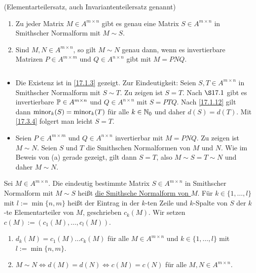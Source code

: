 \documentclass[../../main.tex]{subfiles}
\begin{document}
\begin{sat}\label{17.3.5}
    (Elementarteilersatz, auch Invariantenteilersatz genannt)
    \begin{enumerate}[\normalfont(a)]
        \item Zu jeder Matrix $M\in A^{m\times n}$ gibt es genau eine Matrix $S\in A^{m\times n}$ in Smithscher Normalform mit $M\sim S$.
        \item Sind $M,N\in A^{m\times n}$, so gilt $M\sim N$ genau dann, wenn es invertierbare Matrizen $P\in A^{m\times m}$ und $Q\in A^{n\times n}$ gibt mit $M=PNQ$.
    \end{enumerate}
\end{sat}
\begin{cproof}
    $\;$
    \begin{itemize}[\normalfont(a)]
        \item Die Existenz ist in \ref{17.1.3} gezeigt. Zur Eindeutigkeit: Seien $S,T\in A^{m\times n}$ in Smithscher Normalform mit $S\sim T$. Zu zeigen ist $S=T$. Nach $\S 17.1$ gibt es invertierbare $\P\in A^{m\times n}$ und $Q\in A^{n\times n}$ mit $S=PTQ$. Nach \ref{17.1.12} gilt dann $\minor_k(S)=\minor_k(T)$ für alle $k\in\N_0$ und daher $d(S)=d(T)$. Mit \ref{17.3.4} folgert man leicht $S=T$.
        \item Seien $P\in A^{m\times m}$ und $Q\in A^{n\times n}$ invertierbar mit $M=PNQ$. Zu zeigen ist $M\sim N$. Seien $S$ und $T$ die Smithschen Normalformen von $M$ und $N$. Wie im Beweis von (a) gerade gezeigt, gilt dann $S=T$, also $M\sim S=T\sim N$ und daher $M\sim N$.
    \end{itemize}
\end{cproof}

\begin{df}\label{17.3.6}
    Sei $M\in A^{m\times n}$. Die eindeutig bestimmte Matrix $S\in A^{m\times n}$ in Smithscher Normalform mit $M\sim S$ heißt \underline{die Smithsche Normalform von $M$}. Für $k\in \{1,\ldots ,l\}$ mit $l:=\min\{n,m\}$ heißt der Eintrag in der $k$-ten Zeile und $k$-Spalte von $S$ der $k$-te Elementarteiler von $M$, geschrieben $c_k(M)$. Wir setzen $c(M):=(c_1(M),\ldots ,c_l(M))$.
\end{df}

\begin{kor}\label{17.3.7}
    \begin{enumerate}[\normalfont(a)]
        \item $d_k(M)=c_1(M)\ldots c_k(M)$ für alle $M\in A^{m\times n}$ und $k\in\{1,\ldots ,l\}$ mit $l:=\min\{n,m\}$.
        \item $M\sim N\Longleftrightarrow d(M)=d(N)\Longleftrightarrow c(M)=c(N)$ für alle $M,N\in A^{m\times n}$.
    \end{enumerate}
\end{kor}
\end{document}
